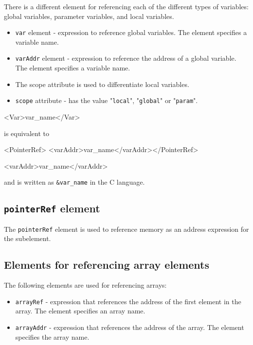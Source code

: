There is a different element for referencing each of the different types of variables: global variables, parameter variables, and local variables.

\begin{itemize}
\item {\tt var} element - expression to reference global variables.
      The element specifies a variable name.
\item {\tt varAddr} element - expression to reference the address of a global variable.
      The element specifies a variable name.
\item The scope attribute is used to differentiate local variables.
\item {\tt scope} attribute - has the value "{\tt local}", "{\tt global}" or "{\tt param}".
\end{itemize}
\vspace{1mm}

\begin{XcodeMLExample}
<Var>var_name</Var> 
\end{XcodeMLExample}

is equivalent to
\vspace{2mm}

\begin{XcodeMLExample}
<PointerRef> <varAddr>var_name</varAddr></PointerRef>
\end{XcodeMLExample}
\vspace{1mm}

\begin{XcodeMLExample}
<varAddr>var_name</varAddr>
\end{XcodeMLExample}

and is written as {\tt \&var\_name} in the C language.


\subsection{ {\tt pointerRef} element}

The {\tt pointerRef} element is used to reference memory as an address expression for the subelement.


\subsection{Elements for referencing array elements}

The following elements are used for referencing arrays:

\begin{itemize}
\item {\tt arrayRef} - expression that references the address of the first element in the array. The element specifies an array name.
\item {\tt arrayAddr} - expression that references the address of the array. The element specifies the array name.
\end{itemize}

